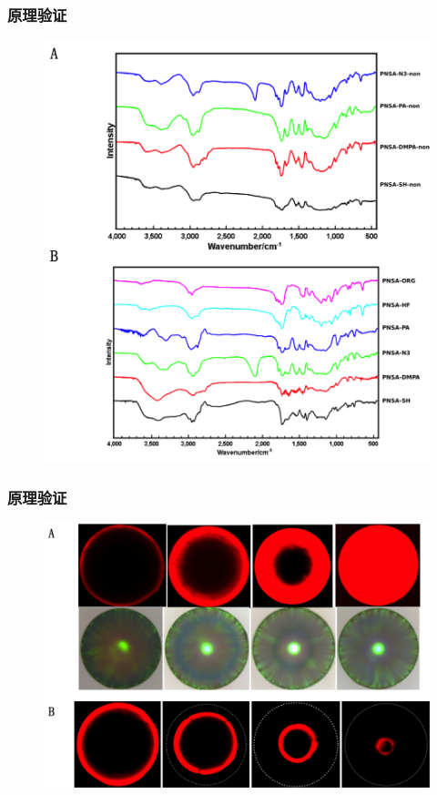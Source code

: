 \documentclass{beamer}
\begin{document}
\begin{frame}
  \frametitle{原理验证}
  \begin{figure}
    \begin{center}
      \includegraphics[width=0.52\linewidth]{figures/ch3/FigureS2.png}
    \end{center}
  \end{figure}
\end{frame}

\begin{frame}
  \frametitle{原理验证}
  \begin{figure}
    \begin{center}
      \includegraphics[width=0.8\linewidth]{figures/ch3/Figure2.png}
    \end{center}
  \end{figure}
\end{frame}
\end{document}
